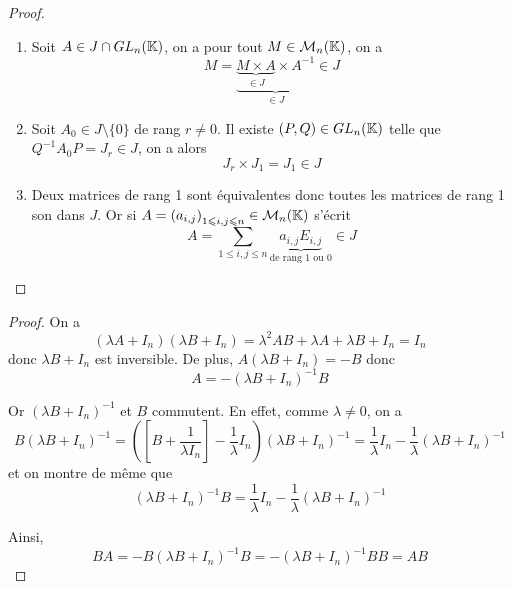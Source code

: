 \documentclass[12pt]{article}
\begin{document}
\begin{proof}
    \phantom{}
    \begin{enumerate}
        \item Soit $A\in J\cap GL_{n}(\mathbb{K})$, on a pour tout $M\in\mathcal{M}_{n}(\mathbb{K})$, on a 
        \begin{equation}
            M=\underbrace{\underbrace{M\times A}_{\in J}\times A^{-1}}_{\in J}\in J
        \end{equation}

        \item Soit $A_{0}\in J\setminus\lbrace0\rbrace$ de rang $r\neq0$. Il existe $(P,Q)\in GL_{n}(\mathbb{K})$ telle que $Q^{-1}A_{0}P=J_{r}\in J$, on a alors 
        \begin{equation}
            \boxed{J_{r}\times J_{1}=J_{1}\in J}
        \end{equation}

        \item Deux matrices de rang 1 sont équivalentes donc toutes les matrices de rang 1 son dans $J$. Or si $A=\left(a_{i,j}\right)_{1\leqslant i,j\leqslant n}\in\mathcal{M}_{n}(\mathbb{K})$ s'écrit 
        \begin{equation}
            \boxed{A=\sum_{1\leqslant i,j\leqslant n}\underbrace{a_{i,j}E_{i,j}}_{\text{de rang 1 ou 0}}\in J}
        \end{equation}
    \end{enumerate}
\end{proof}

\begin{proof}
    On a 
    \begin{equation}
        (\lambda A+I_{n})(\lambda B+I_{n})=\lambda^{2} AB+\lambda A+\lambda B+I_{n}=I_{n}
    \end{equation}
    donc $\lambda B+I_{n}$ est inversible. De plus, $A(\lambda B+I_{n})=-B$ donc 
    \begin{equation}
        A=-\left(\lambda B+I_{n}\right)^{-1}B
    \end{equation}

    Or $(\lambda B+I_{n})^{-1}$ et $B$ commutent. En effet, comme $\lambda\neq0$, on a 
    \begin{equation}
        B(\lambda B+I_{n})^{-1}=\left(\left[B+\frac{1}{\lambda I_{n}}\right]-\frac{1}{\lambda}I_{n}\right)(\lambda B+I_{n})^{-1}=\frac{1}{\lambda}I_{n}-\frac{1}{\lambda}(\lambda B+I_{n})^{-1}
    \end{equation}
    et on montre de même que 
    \begin{equation}
        (\lambda B+I_{n})^{-1}B=\frac{1}{\lambda}I_{n}-\frac{1}{\lambda}(\lambda B+I_{n})^{-1}
    \end{equation}

    Ainsi, 
    \begin{equation}
        \boxed{BA=-B(\lambda B+I_{n})^{-1}B=-(\lambda B+I_{n})^{-1}BB=AB}
    \end{equation}
\end{proof}
\end{document}
